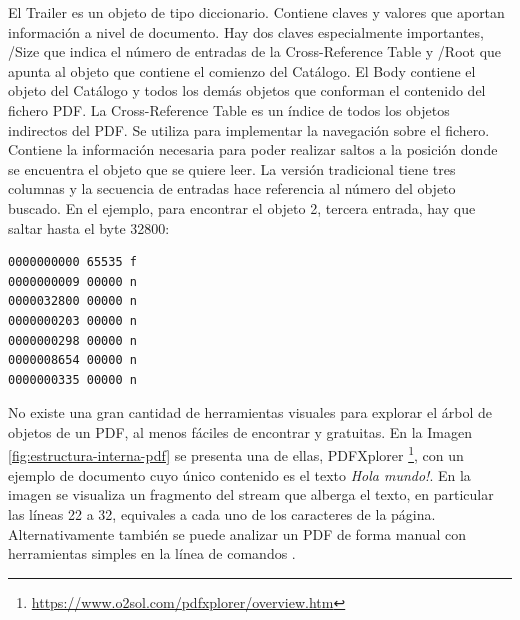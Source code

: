 El Trailer es un objeto de tipo diccionario. Contiene claves y valores que aportan información a nivel de documento. Hay dos claves especialmente importantes, /Size que indica el número de entradas de la Cross-Reference Table y /Root que apunta al objeto que contiene el comienzo del Catálogo. El Body contiene el objeto del Catálogo y todos los demás objetos que conforman el contenido del fichero PDF. La Cross-Reference Table es un índice de todos los objetos indirectos del PDF. Se utiliza para implementar la navegación sobre el fichero. Contiene la información necesaria para poder realizar saltos a la posición donde se encuentra el objeto que se quiere leer. La versión tradicional tiene tres columnas y la secuencia de entradas hace referencia al número del objeto buscado. En el ejemplo, para encontrar el objeto 2, tercera entrada, hay que saltar hasta el byte 32800:

\begin{lstlisting}[caption={Entradas en la Cross-Reference Table},label=lst:cross-ref-table]
0000000000 65535 f
0000000009 00000 n
0000032800 00000 n
0000000203 00000 n
0000000298 00000 n
0000008654 00000 n
0000000335 00000 n
\end{lstlisting}

No existe una gran cantidad de herramientas visuales para explorar el árbol de objetos de un PDF, al menos fáciles de encontrar y gratuitas. En la Imagen \ref{fig:estructura-interna-pdf} se presenta una de ellas, PDFXplorer \footnote{\url{https://www.o2sol.com/pdfxplorer/overview.htm}}, con un ejemplo de documento cuyo único contenido es el texto \emph{Hola mundo!}. En la imagen se visualiza un fragmento del stream que alberga el texto, en particular las líneas 22 a 32, equivales a cada uno de los caracteres de la página. Alternativamente también se puede analizar un PDF de forma manual con herramientas simples en la línea de comandos \cite{filodej_blog_pdfstreamcontent}.

